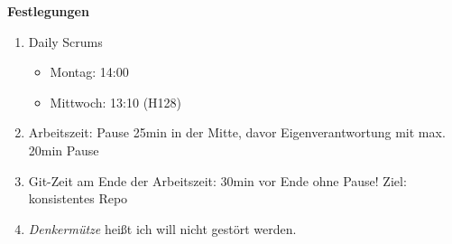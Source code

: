 \textbf{Festlegungen}
\begin{enumerate}
	\item Daily Scrums
		\begin{itemize}
			\item Montag: 14:00
			\item Mittwoch: 13:10 (H128)
		\end{itemize}
	\item Arbeitszeit: Pause 25min in der Mitte, davor Eigenverantwortung mit max. 20min Pause
	\item Git-Zeit am Ende der Arbeitszeit: 30min vor Ende ohne Pause! Ziel: konsistentes Repo
	\item \textit{Denkermütze} heißt ich will nicht gestört werden.
\end{enumerate}